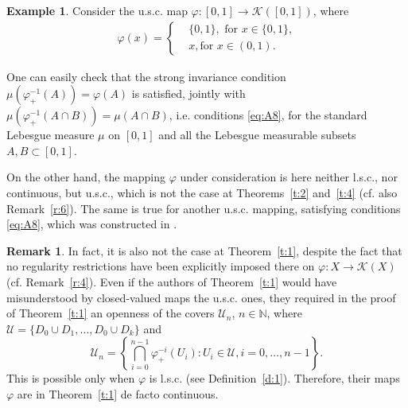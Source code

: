 \documentclass[12pt]{amsart}
\theoremstyle{definition}
\newtheorem{remark}{Remark}
\newtheorem{example}{Example}
\newcommand{\U}{\mathcal{U}}
\newcommand\N{\mathbb{N}}
\newcommand{\KK}{\mathcal K}
\newcommand{\vp}{\varphi}
\begin{document}
\begin{example}\label{e:4}
Consider the u.s.c. map $\vp:[0,1]\to\KK([0,1])$, where
\begin{align*}
	\vp(x) =
	\begin{cases}
		&\{0,1\}, \mbox{ for $x\in\{0,1\}$,}\\
		&x,\mbox{for $x\in(0,1)$.}
	\end{cases}
\end{align*}

One can easily check that the strong invariance condition $\mu(\vp^{-1}_+(A)) = \vp(A)$ is satisfied, jointly with $\mu(\vp^{-1}_+(A\cap B))=\mu(A\cap B)$, i.e. conditions \eqref{eq:A8}, for the standard Lebesgue measure $\mu$ on $[0,1]$ and all the Lebesgue measurable subsets $A,B\subset [0,1]$.

On the other hand, the mapping $\vp$ under consideration is here neither l.s.c., nor continuous, but u.s.c., which is not the case at Theorems~\ref{t:2} and~\ref{t:4} (cf. also Remark~\ref{r:6}). The same is true for another u.s.c. mapping, satisfying conditions \eqref{eq:A8}, which was constructed in \cite[Example 2.5]{VS}.
\end{example}

\begin{remark}\label{r:9}
In fact, it is also not the case at Theorem~\ref{t:1}, despite the fact that no regularity restrictions have been explicitly imposed there on $\vp:X\to\KK(X)$ (cf. Remark~\ref{r:4}). Even if the authors of Theorem~\ref{t:1} would have misunderstood by closed-valued maps the u.s.c. ones, they required in the proof of Theorem~\ref{t:1} an openness of the covers $\U_n$, $n\in\N$, where $\U=\{D_0\cup D_1,\ldots,D_0\cup D_k\}$ and
\[
\U_n = \left\{ \bigcap_{i=0}^{n-1} \vp^{-i}_+(U_i): U_i\in\U, i=0,\ldots,n-1\right\}.
\]
This is possible only when $\vp$ is l.s.c. (see Definition~\ref{d:1}). Therefore, their maps $\vp$ are in Theorem~\ref{t:1} de facto continuous.
\end{remark}


\end{document}
